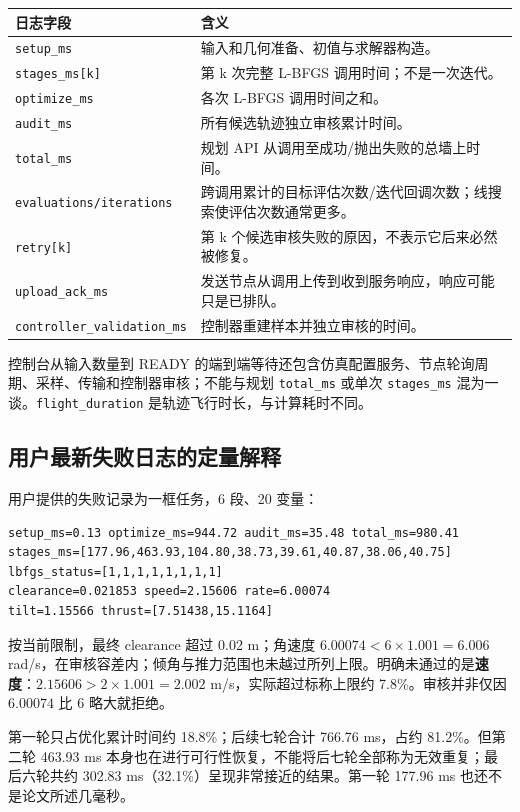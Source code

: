 \documentclass[UTF8,fontset=fandol,a4paper,10pt]{ctexart}
\newcommand{\code}[1]{{\small\nolinkurl{#1}}}
\begin{document}
\noindent\begin{tabularx}{\linewidth}{@{}p{48mm}Y@{}}\toprule
日志字段 & 含义\\\midrule
\code{setup_ms} & 输入和几何准备、初值与求解器构造。\\
\code{stages_ms[k]} & 第 k 次完整 L-BFGS 调用时间；不是一次迭代。\\
\code{optimize_ms} & 各次 L-BFGS 调用时间之和。\\
\code{audit_ms} & 所有候选轨迹独立审核累计时间。\\
\code{total_ms} & 规划 API 从调用至成功/抛出失败的总墙上时间。\\
\code{evaluations/iterations} & 跨调用累计的目标评估次数/迭代回调次数；线搜索使评估次数通常更多。\\
\code{retry[k]} & 第 k 个候选审核失败的原因，不表示它后来必然被修复。\\
\code{upload_ack_ms} & 发送节点从调用上传到收到服务响应，响应可能只是已排队。\\
\code{controller_validation_ms} & 控制器重建样本并独立审核的时间。\\\bottomrule
\end{tabularx}
控制台从输入数量到 READY 的端到端等待还包含仿真配置服务、节点轮询周期、采样、传输和控制器审核；不能与规划 \code{total_ms} 或单次 \code{stages_ms} 混为一谈。\code{flight_duration} 是轨迹飞行时长，与计算耗时不同。

\subsection{用户最新失败日志的定量解释}
用户提供的失败记录为一框任务，6 段、20 变量：
\begin{lstlisting}
setup_ms=0.13 optimize_ms=944.72 audit_ms=35.48 total_ms=980.41
stages_ms=[177.96,463.93,104.80,38.73,39.61,40.87,38.06,40.75]
lbfgs_status=[1,1,1,1,1,1,1,1]
clearance=0.021853 speed=2.15606 rate=6.00074
tilt=1.15566 thrust=[7.51438,15.1164]
\end{lstlisting}
按当前限制，最终 clearance 超过 0.02 m；角速度 $6.00074<6\times1.001=6.006$ rad/s，在审核容差内；倾角与推力范围也未越过所列上限。明确未通过的是\textbf{速度}：$2.15606>2\times1.001=2.002$ m/s，实际超过标称上限约 7.8\%。审核并非仅因 $6.00074$ 比 6 略大就拒绝。

第一轮只占优化累计时间约 18.8\%；后续七轮合计 766.76 ms，占约 81.2\%。但第二轮 463.93 ms 本身也在进行可行性恢复，不能将后七轮全部称为无效重复；最后六轮共约 302.83 ms（32.1\%）呈现非常接近的结果。第一轮 177.96 ms 也还不是论文所述几毫秒。
\end{document}
